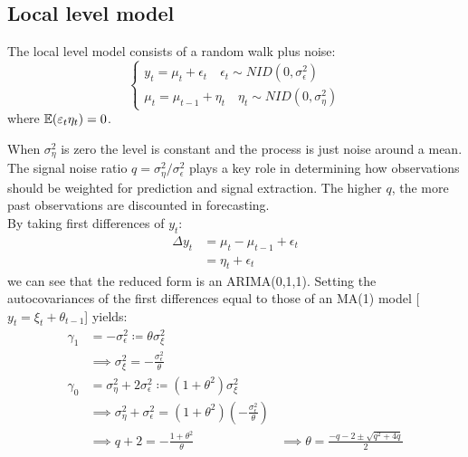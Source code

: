 \documentclass[DIV=14,titlepage=false]{scrreprt}
\begin{document}
\subsection{Local level model}
\begin{definition}
    The local level model consists of a random walk plus noise:
\[
    \begin{cases*}
        y_t = \mu_t + \epsilon_t \quad \epsilon_t \sim NID(0,\sigma^2_\epsilon)\\
        \mu_t = \mu_{t-1} + \eta_t \quad \eta_t \sim NID(0,\sigma^2_\eta)
    \end{cases*}
\]
where $\mathbb{E}(\varepsilon_t \eta_t) = 0$.
\end{definition}
When $\sigma^2_\eta$ is zero the level is constant and the process is just noise around a mean. The signal noise ratio $q = \sigma^2_\eta / \sigma^2_\epsilon$ plays a key role in determining how observations should be weighted for prediction and signal extraction. The higher $q$, the more past observations are discounted in forecasting.\\
By taking first differences of $y_t$:
\begin{align*}
    \Delta y_t &= \mu_t - \mu_{t-1} + \epsilon_t\\
    &= \eta_t + \epsilon_t
\end{align*}
we can see that the reduced form is an ARIMA(0,1,1). Setting the autocovariances of the first differences equal to those of an MA(1) model [$y_t = \xi_t + \theta_{t-1}$] yields:
\begin{align*}
    \gamma_1 &= -\sigma^2_\epsilon \coloneq \theta \sigma^2_\xi\\
    & \implies \sigma^2_\xi = -\frac{\sigma^2_\epsilon}{\theta}\\    
    \gamma_0 &= \sigma^2_\eta + 2 \sigma^2_\epsilon \coloneq (1+\theta^2)\sigma^2_\xi\\
    & \implies \sigma^2_\eta + \sigma^2_\epsilon = (1+\theta^2)\left(-\frac{\sigma^2_\epsilon}{\theta}\right)\\
    & \implies q +2 = -\frac{1+\theta^2}{\theta}
    & \implies \theta = \frac{-q-2 \pm \sqrt{q^2+4q}}{2}
\end{align*}
\end{document}
